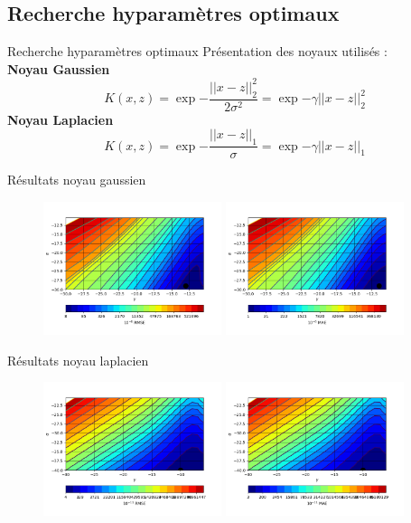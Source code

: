 \documentclass{beamer}
\begin{document}
\subsection{Recherche hyparamètres optimaux}
\begin{frame}{Recherche hyparamètres optimaux}
Présentation des noyaux utilisés :\\
\textbf{Noyau Gaussien}
\[ 
	K(x,z) = \exp{- \frac{||x-z||_{2}^2}{2\sigma^2}}  = \exp{- \gamma ||x-z||_{2}^2}
\]
\textbf{Noyau Laplacien}
\[ 
	K(x,z) = \exp{- \frac{||x-z||_{1}}{\sigma}} =  \exp{- \gamma ||x-z||_{1}}
\]
\end{frame}
\begin{frame}{Résultats noyau gaussien}
\begin{figure}[!h]	
		\includegraphics[height = 3.9cm, keepaspectratio]{graphes/resultat_RBF_RMSE.png}
		\includegraphics[height = 3.9cm, keepaspectratio]{graphes/resultat_RBF_MAE.png}
		\end{figure}
\end{frame}
\begin{frame}{Résultats noyau laplacien}
\begin{figure}[!h]	
		\includegraphics[height = 3.9cm, keepaspectratio]{graphes/resultat_Lapla_RMSE.png}
		\includegraphics[height = 3.9cm, keepaspectratio]{graphes/resultat_Lapla_MAE.png}
		\end{figure}
\end{frame}
\end{document}
